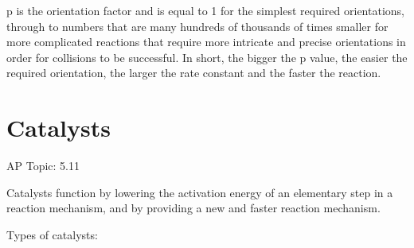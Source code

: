 \documentclass[../chem.tex]{subfiles}
\begin{document}
p is the orientation factor and is equal to 1 for the simplest required orientations, through to numbers that are many hundreds of thousands of times smaller for more 
complicated reactions that require more intricate and precise orientations in order for collisions to be successful. In short, the bigger the p value, the easier the required 
orientation, the larger the rate constant and the faster the reaction.
\section{Catalysts}
AP Topic: 5.11

Catalysts function by lowering the activation energy of an elementary step in a reaction mechanism, and by providing a new and faster reaction mechanism.

Types of catalysts:
\end{document}
